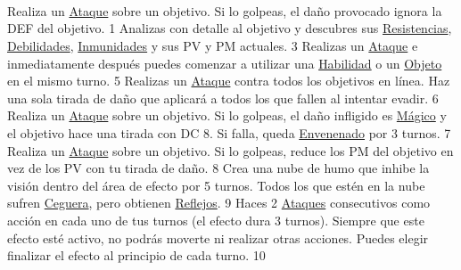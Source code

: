 \pagebreak \\
\\\\
  { Realiza un \hyperlink{action}{Ataque} sobre un objetivo. Si lo golpeas, el daño provocado ignora la DEF del objetivo. }{}{1}   { Analizas con detalle al objetivo y descubres sus \hyperlink{type}{Resistencias}, \hyperlink{type}{Debilidades}, \hyperlink{type}{Inmunidades} y sus PV y PM actuales. }{}{3}  { Realizas un \hyperlink{action}{Ataque} e inmediatamente después puedes comenzar a utilizar una \hyperlink{action}{Habilidad} o un \hyperlink{item}{Objeto} en el mismo turno. }{}{5}  { Realizas un \hyperlink{action}{Ataque} contra todos los objetivos en línea. Haz una sola tirada de daño que aplicará a todos los que fallen al intentar evadir. }{}{6}  { Realiza un \hyperlink{action}{Ataque} sobre un objetivo. Si lo golpeas, el daño infligido es \hyperlink{type}{Mágico} y el objetivo hace una tirada con DC 8. Si falla, queda \hyperlink{status}{Envenenado} por 3 turnos. }{\poison}{7}  { Realiza un \hyperlink{action}{Ataque} sobre un objetivo. Si lo golpeas, reduce los PM del objetivo en vez de los PV con tu tirada de daño. }{}{8}  { Crea una nube de humo que inhibe la visión dentro del área de efecto por 5 turnos. Todos los que estén en la nube sufren \hyperlink{status}{Ceguera}, pero obtienen \hyperlink{status}{Reflejos}. }{\blind\blink}{9}  { Haces 2 \hyperlink{action}{Ataques} consecutivos como acción en cada uno de tus turnos (el efecto dura 3 turnos). Siempre que este efecto esté activo, no podrás moverte ni realizar otras acciones. Puedes elegir finalizar el efecto al principio de cada turno. }{}{10}
\pagebreak
